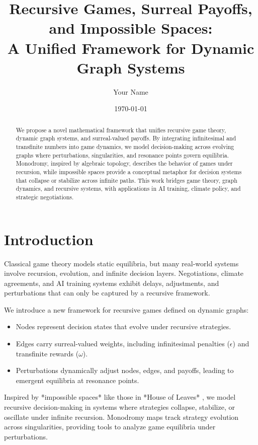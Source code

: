 \documentclass[12pt]{article}
\title{\textbf{Recursive Games, Surreal Payoffs, and Impossible Spaces:\\
A Unified Framework for Dynamic Graph Systems}}
\author{Your Name}
\date{\today}
\begin{document}
\maketitle

\begin{abstract}
We propose a novel mathematical framework that unifies recursive game theory, dynamic graph systems, and surreal-valued payoffs. By integrating infinitesimal and transfinite numbers into game dynamics, we model decision-making across evolving graphs where perturbations, singularities, and resonance points govern equilibria. Monodromy, inspired by algebraic topology, describes the behavior of games under recursion, while impossible spaces provide a conceptual metaphor for decision systems that collapse or stabilize across infinite paths. This work bridges game theory, graph dynamics, and recursive systems, with applications in AI training, climate policy, and strategic negotiations.
\end{abstract}

\section{Introduction}
Classical game theory models static equilibria, but many real-world systems involve recursion, evolution, and infinite decision layers. Negotiations, climate agreements, and AI training systems exhibit delays, adjustments, and perturbations that can only be captured by a recursive framework.

We introduce a new framework for recursive games defined on dynamic graphs:
\begin{itemize}
    \item Nodes represent decision states that evolve under recursive strategies.
    \item Edges carry surreal-valued weights, including infinitesimal penalties (\(\epsilon\)) and transfinite rewards (\(\omega\)).
    \item Perturbations dynamically adjust nodes, edges, and payoffs, leading to emergent equilibria at resonance points.
\end{itemize}

Inspired by *impossible spaces* like those in *House of Leaves* \cite{danielewski2000house}, we model recursive decision-making in systems where strategies collapse, stabilize, or oscillate under infinite recursion. Monodromy maps track strategy evolution across singularities, providing tools to analyze game equilibria under perturbations.
\end{document}
